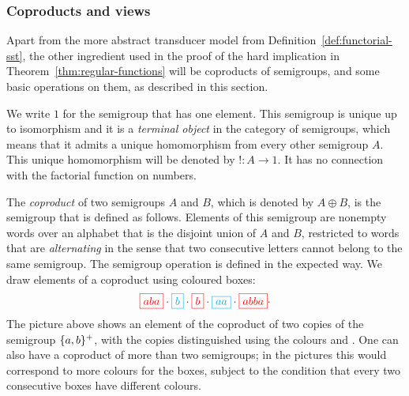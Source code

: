


\subsubsection{Coproducts and views}
\label{sec:coproducts-and-views}

Apart from the more abstract transducer model from Definition~\ref{def:functorial-sst}, the other ingredient used  in the proof of the hard implication in Theorem~\ref{thm:regular-functions} will be coproducts of semigroups, and some basic operations on them, as described in this section.

We write $1$ for the semigroup that has one element. This semigroup is unique up to isomorphism and it is a \emph{terminal object} in the category of semigroups, which means that it admits a unique homomorphism from every other semigroup $A$. This unique homomorphism will be denoted by $! : A \to 1$. It has no connection with the factorial function on numbers. 

The \emph{coproduct}  of two semigroups $A$ and $B$, which is denoted by $A \oplus B$, is the semigroup that is defined as follows. Elements of this semigroup are nonempty words over an alphabet that is the disjoint union of $A$ and $B$, restricted to words that are \emph{alternating} in the sense that two consecutive letters cannot belong to the same semigroup. The semigroup operation is defined in the expected way. We draw elements of a coproduct using coloured boxes:
\begin{align*}
    {\color{red}\boxed{aba}} \cdot 
    {\color{cyan}\boxed{b}} \cdot 
    {\color{red}\boxed{b}} \cdot 
    {\color{cyan}\boxed{aa}} \cdot 
    {\color{red}\boxed{abba}} \cdot 
\end{align*}
The picture above shows an element of the coproduct of two copies of the semigroup $\{a,b\}^+$, with the copies distinguished using the colours  and . One can also have a coproduct of more than two semigroups; in the pictures this would correspond to more colours for the boxes, subject to the condition that every two consecutive boxes have different colours.








